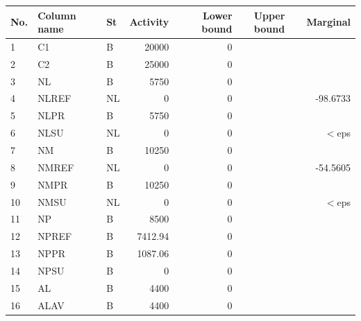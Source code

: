 \documentclass[a4paper,10pt]{article}
\begin{document}
\begin{center}
  \begin{tabular}{| l  l  l  r  r  c  r |}
    \hline
    No. &  Column name &    St &     Activity &       Lower bound &     Upper bound &      Marginal 	\\ \hline
    \hline
      1 &   C1 &             B &            20000 &               0 &                &		\\
      2 &   C2 &             B &            25000 &               0 &                &		\\ \hline                 
      3 &   NL &             B &             5750 &               0 &                &		\\                
      4 &   NLREF &          NL &               0 &               0 &                 &     -98.6733 \\ 
      5 &   NLPR &           B &             5750 &               0 &                &		\\                
      6 &   NLSU &           NL &               0 &               0 &                 &        $<$eps \\  \hline 
      7 &   NM &             B &            10250 &               0 &                &		\\                
      8 &   NMREF &          NL &               0 &               0 &                 &     -54.5605 \\ 
      9 &   NMPR &           B &            10250 &               0 &                &		\\                
     10 &   NMSU &           NL &               0 &               0 &                 &        $<$eps \\ \hline
     11 &   NP &             B &             8500 &               0 &                &		\\                
     12 &   NPREF &          B &          7412.94 &               0 &                &		\\                
     13 &   NPPR &           B &          1087.06 &               0 &                &		\\                
     14 &   NPSU &           B &                0 &               0 &                &		\\ \hline        
     15 &   AL &             B &             4400 &               0 &                &		\\                
     16 &   ALAV &           B &             4400 &               0 &                &		\\  

\end{tabular}
\end{center}
\end{document}
